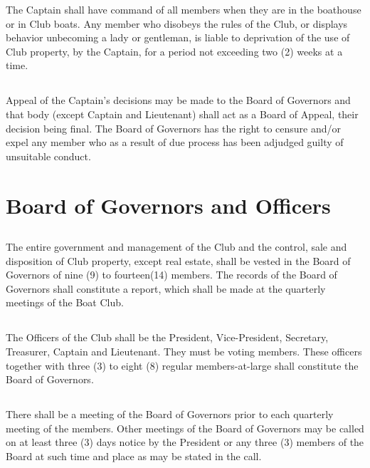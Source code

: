 \documentclass[11pt,american,letterpaper,]{constitution}
\begin{document}
The Captain shall have command of all members when they are in the boathouse or in Club boats. Any member who disobeys the rules of the Club, or displays behavior unbecoming a lady or gentleman, is liable to deprivation of the use of Club property, by the Captain, for a period not exceeding two (2) weeks at a time.

\subsection[Board of Appeal]{} 

Appeal of the Captain's decisions may be made to the Board of Governors and that body (except Captain and Lieutenant) shall act as a Board of Appeal, their decision being final. The Board of Governors has the right to censure and/or expel any member who as a result of due process has been adjudged guilty of unsuitable conduct.

\section{Board of Governors and Officers}

\subsection[Board of Governors]{} 

The entire government and management of the Club and the control, sale and disposition of Club property, except real estate, shall be vested in the Board of Governors of nine (9) to fourteen(14) members. The records of the Board of Governors shall constitute a report, which shall be made at the quarterly meetings of the Boat Club.

\subsection[Officers]{} 

The Officers of the Club shall be the President, Vice-President, Secretary, Treasurer, Captain and Lieutenant. They must be voting members. These officers together with three (3) to eight (8) regular members-at-large shall constitute the Board of Governors.

\subsection[Meetings]{} 

There shall be a meeting of the Board of Governors prior to each quarterly meeting of the members. Other meetings of the Board of Governors may be called on at least three (3) days notice by the President or any three (3) members of the Board at such time and place as may be stated in the call.
\end{document}
